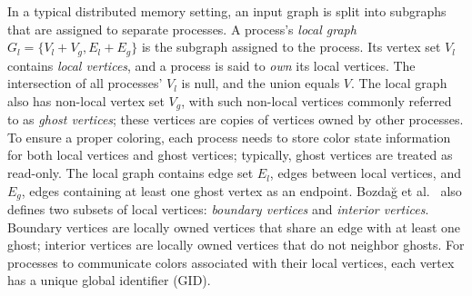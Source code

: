 In a typical distributed memory setting, an input graph is split into subgraphs that are assigned to separate processes.
A process's \emph{local graph} $G_l = \{V_l+V_g, E_l+E_g\}$ is the subgraph assigned to the process.
Its vertex set $V_l$ contains \emph{local vertices}, and a process is said to \emph{own} its local vertices.  The intersection of all processes' $V_l$ 
is null, and the union equals $V$.
The local graph also has non-local vertex set $V_g$, with such non-local vertices commonly referred to as \emph{ghost vertices}; these vertices are copies of 
vertices owned by other processes.
To ensure a proper coloring, each process needs to store color state information for both local vertices and ghost vertices; typically, ghost vertices are treated as read-only.
The local graph contains edge set $E_l$, edges between local vertices, and $E_g$, edges containing at least one ghost vertex as an endpoint.
Bozda{\u{g}} et al.~\cite{IAB:bozdaug2008framework} also defines two subsets of local vertices: \emph{boundary vertices} and \emph{interior vertices}.
Boundary vertices are locally owned vertices that share an edge with at least one ghost; interior vertices are locally owned vertices that do not neighbor ghosts.
For processes to communicate colors associated with their local vertices, each vertex has a unique global identifier (GID).


